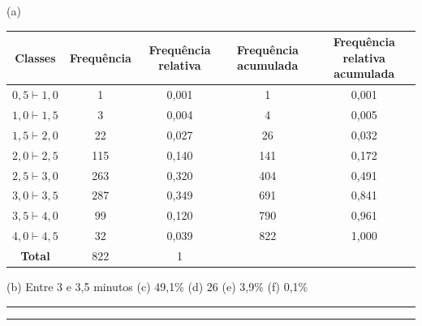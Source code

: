 \documentclass[a4paper,11pt,fleqn]{article}\usepackage[]{graphicx}\usepackage[]{color}
\theoremstyle{definition}
\begin{document}
\begin{compactenum}[6.]
\item (a)

\begin{table}[h]
  \centering
  \begin{tabular}{ccccc}
    \hline
    \textbf{Classes} & \textbf{Frequência} & \textbf{Frequência
      relativa} & \textbf{Frequência acumulada} & \textbf{Frequência
      relativa acumulada} \\
    \hline
    $0,5 \vdash 1,0$ & 1   & 0,001 & 1   & 0,001 \\
    $1,0 \vdash 1,5$ & 3   & 0,004 & 4   & 0,005 \\
    $1,5 \vdash 2,0$ & 22  & 0,027 & 26  & 0,032 \\
    $2,0 \vdash 2,5$ & 115 & 0,140 & 141 & 0,172 \\
    $2,5 \vdash 3,0$ & 263 & 0,320 & 404 & 0,491 \\
    $3,0 \vdash 3,5$ & 287 & 0,349 & 691 & 0,841 \\
    $3,5 \vdash 4,0$ & 99  & 0,120 & 790 & 0,961 \\
    $4,0 \vdash 4,5$ & 32  & 0,039 & 822 & 1,000 \\
    \hline
    \textbf{Total} & 822 & 1 & & \\
    \hline
  \end{tabular}
\end{table}
\begin{compactenum}
  \item[] (b) Entre 3 e 3,5 minutos \quad (c) 49,1\%  \quad (d) 26  \quad
    (e) 3,9\%  \quad (f) 0,1\%
  \end{compactenum}
\end{compactenum}

\vspace{0.3cm}
\hrule
\vspace{0.3cm}

\clearpage

\vspace{0.3cm}
\hrule
\vspace{0.3cm}
\end{document}
